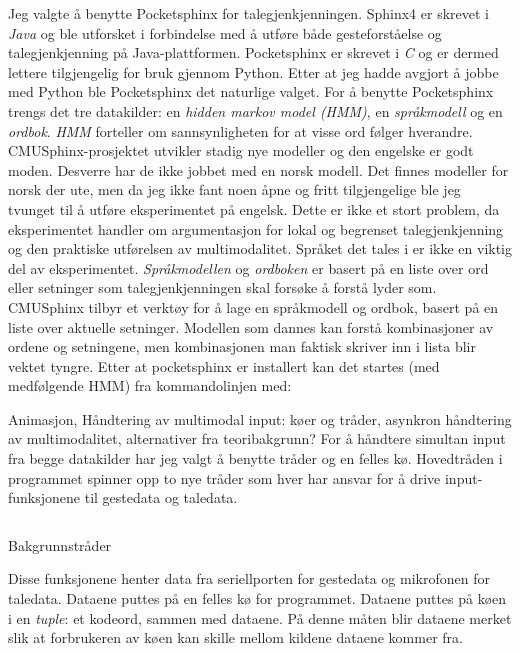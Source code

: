 Jeg valgte å benytte Pocketsphinx for talegjenkjenningen. Sphinx4 er skrevet i \emph{Java} og ble utforsket i forbindelse med å utføre både gesteforståelse og talegjenkjenning på Java-plattformen. Pocketsphinx er skrevet i \emph{C} og er dermed lettere tilgjengelig for bruk gjennom Python. Etter at jeg hadde avgjort å jobbe med Python ble Pocketsphinx det naturlige valget. For å benytte Pocketsphinx trengs det tre datakilder: en \emph{hidden markov model (HMM)}, en \emph{språkmodell} og en \emph{ordbok}. \emph{HMM} forteller om sannsynligheten for at visse ord følger hverandre. CMUSphinx-prosjektet utvikler stadig nye modeller og den engelske er godt moden. Desverre har de ikke jobbet med en norsk modell. Det finnes modeller for norsk der ute, men da jeg ikke fant noen åpne og fritt tilgjengelige ble jeg tvunget til å utføre eksperimentet på engelsk. Dette er ikke et stort problem, da eksperimentet handler om argumentasjon for lokal og begrenset talegjenkjenning og den praktiske utførelsen av multimodalitet. Språket det tales i er ikke en viktig del av eksperimentet. \emph{Språkmodellen} og \emph{ordboken} er basert på en liste over ord eller setninger som talegjenkjenningen skal forsøke å forstå lyder som. CMUSphinx tilbyr et verktøy for å lage en språkmodell og ordbok, basert på en liste over aktuelle setninger. Modellen som dannes kan forstå kombinasjoner av ordene og setningene, men kombinasjonen man faktisk skriver inn i lista blir vektet tyngre.  Etter at pocketsphinx er installert kan det startes (med medfølgende HMM) fra kommandolinjen med:\newline



{\color{red}Animasjon, Håndtering av multimodal input: køer og tråder, asynkron håndtering av multimodalitet, alternativer fra teoribakgrunn?}
For å håndtere simultan input fra begge datakilder har jeg valgt å benytte tråder og en felles kø. Hovedtråden i programmet spinner opp to nye tråder som hver har ansvar for å drive input-funksjonene til gestedata og taledata. 

\begin{listing}[ht]
\inputminted[fontsize=\footnotesize, linenos]{python}{kodesnutter/background_threads.py}
\label{code:backgroundthreads}
\caption{Bakgrunnstråder}
\end{listing}

Disse funksjonene henter data fra seriellporten for gestedata og mikrofonen for taledata. Dataene puttes på en felles kø for programmet. Dataene puttes på køen i en \emph{tuple}: et kodeord, sammen med dataene. På denne måten blir dataene merket slik at forbrukeren av køen kan skille mellom kildene dataene kommer fra.

